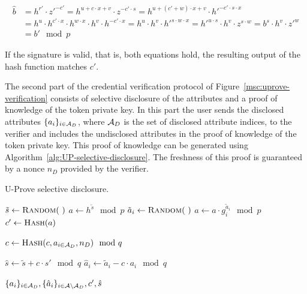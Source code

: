 \begin{align*}
  \hat{b}
  & = h^{r'} \cdot z'^{-c'}
  = h^{u + c \cdot x + v} \cdot z^{-c' \cdot s}
  = h^{u + (c' + w) \cdot x + v} \cdot h'^{-c' \cdot s \cdot x} \\
  & = h^u \cdot h^{c' \cdot x} \cdot h^{w \cdot x} \cdot h^v \cdot h^{-c' \cdot x}
  = h^u \cdot h^v \cdot h'^{s \cdot w \cdot x}
  = h'^{u \cdot s} \cdot h^v \cdot z^{s \cdot w}
  = b^s \cdot h^v \cdot z'^w \\
  & = b' \mod p
\end{align*}

If the signature is valid, that is, both equations hold, the resulting output of
the hash function matches $c'$.

The second part of the credential verification protocol of
Figure~\ref{msc:uprove-verification} consists of selective disclosure of the
attributes and a proof of knowledge of the token private key. In this part the
user sends the disclosed attributes $\{a_i\}_{i \in \mathcal{A}_D}$, where $\mathcal{A}_D$ is the
set of disclosed attribute indices, to the verifier and includes the undisclosed
attributes in the proof of knowledge of the token private key. This proof of
knowledge can be generated using Algorithm~\ref{alg:UP-selective-disclosure}.
The freshness of this proof is guaranteed by a nonce $n_D$ provided by the
verifier.

\begin{algorithm}
  \caption{U-Prove selective disclosure.}
  \label{alg:UP-selective-disclosure}
  \addtolength{\baselineskip}{1mm}
  \begin{algorithmic}[1]
      \State $\tilde{s} \gets \Call{Random}{~}$
      \State $a \gets h^{\tilde{s}} \mod p$
        \State $\tilde{a}_i \gets \Call{Random}{~}$
        \State $a \gets a \cdot g_i^{\tilde{a}_i} \mod p$
      \EndFor
      \State $c' \gets \Call{Hash}{a}$

      \State $c \gets \Call{Hash}{c, a_{i \in \A_D}, n_D} \mod q$

      \State $\hat{s} \gets \tilde{s} + c \cdot s' \mod q$
        \State $\hat{a}_i \gets \tilde{a}_i - c \cdot a_i \mod q$
      \EndFor

      \Return $\{a_i\}_{i \in \mathcal{A}_D}, \{\hat{a}_i\}_{i \in \mathcal{A} \setminus \mathcal{A}_D}, c', \hat{s}$
    \EndFunction
  \end{algorithmic}
\end{algorithm}

